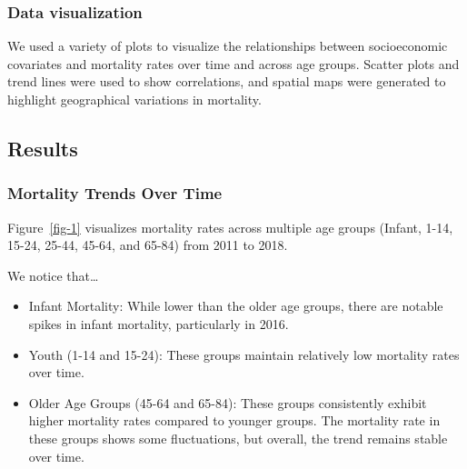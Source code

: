 \documentclass[
  letterpaper,
  DIV=11,
  numbers=noendperiod]{scrartcl}
\begin{document}
\hypertarget{data-visualization}{%
\subsubsection{Data visualization}\label{data-visualization}}

We used a variety of plots to visualize the relationships between
socioeconomic covariates and mortality rates over time and across age
groups. Scatter plots and trend lines were used to show correlations,
and spatial maps were generated to highlight geographical variations in
mortality.

\hypertarget{results}{%
\subsection{Results}\label{results}}

\hypertarget{mortality-trends-over-time}{%
\subsubsection{Mortality Trends Over
Time}\label{mortality-trends-over-time}}

Figure~\ref{fig-1} visualizes mortality rates across multiple age groups
(Infant, 1-14, 15-24, 25-44, 45-64, and 65-84) from 2011 to 2018.

We notice that\ldots{}

\begin{itemize}
\item
  Infant Mortality: While lower than the older age groups, there are
  notable spikes in infant mortality, particularly in 2016.
\item
  Youth (1-14 and 15-24): These groups maintain relatively low mortality
  rates over time.
\item
  Older Age Groups (45-64 and 65-84): These groups consistently exhibit
  higher mortality rates compared to younger groups. The mortality rate
  in these groups shows some fluctuations, but overall, the trend
  remains stable over time.
\end{itemize}
\end{document}
